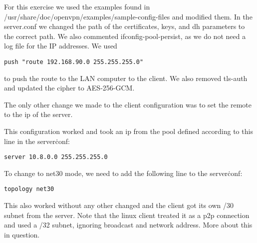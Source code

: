 
For this exercise we used the examples found in /usr/share/doc/openvpn/examples/sample-config-files and modified them. In the server.conf we changed the path of the certificates, keys, and dh parameters to the correct path. We also commented ifconfig-pool-persist, as we do not need a log file for the IP addresses. We used 
\begin{verbatim}
push "route 192.168.90.0 255.255.255.0"
\end{verbatim}
to push the route to the LAN computer to the client. We also removed tls-auth and updated the cipher to AES-256-GCM.

The only other change we made to the client configuration was to set the remote to the ip of the server.

This configuration worked and took an ip from the pool defined according to this line in the server\.conf:
\begin{verbatim}
server 10.8.0.0 255.255.255.0
\end{verbatim}

To change to net30 mode, we need to add the following line to the server\.conf:
\begin{verbatim}
topology net30
\end{verbatim}

This also worked without any other changed and the client got its own /30 subnet from the server. Note that the linux client treated it as a p2p connection and used a /32 subnet, ignoring broadcast and network address. More about this in question.